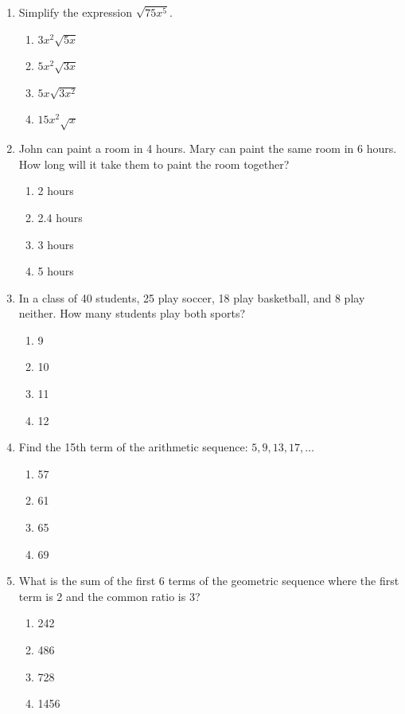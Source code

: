 \documentclass[12pt]{article}
\begin{document}
\begin{enumerate}
    \item Simplify the expression $\sqrt{75x^5}$.
    \begin{enumerate}
        \item $3x^2\sqrt{5x}$
        \item $5x^2\sqrt{3x}$
        \item $5x\sqrt{3x^2}$
        \item $15x^2\sqrt{x}$
    \end{enumerate}

    \item John can paint a room in 4 hours. Mary can paint the same room in 6 hours. How long will it take them to paint the room together?
    \begin{enumerate}
        \item 2 hours
        \item 2.4 hours
        \item 3 hours
        \item 5 hours
    \end{enumerate}

    \item In a class of 40 students, 25 play soccer, 18 play basketball, and 8 play neither. How many students play both sports?
    \begin{enumerate}
        \item 9
        \item 10
        \item 11
        \item 12
    \end{enumerate}

    \item Find the 15th term of the arithmetic sequence: $5, 9, 13, 17, \dots$
    \begin{enumerate}
        \item 57
        \item 61
        \item 65
        \item 69
    \end{enumerate}

    \item What is the sum of the first 6 terms of the geometric sequence where the first term is 2 and the common ratio is 3?
    \begin{enumerate}
        \item 242
        \item 486
        \item 728
        \item 1456
    \end{enumerate}


\end{enumerate}
\end{document}

